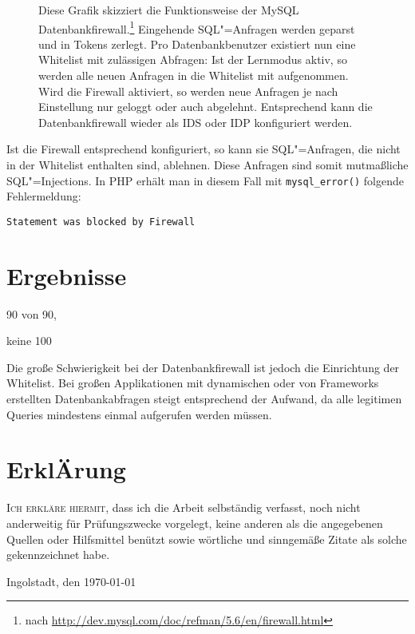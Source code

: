 \begin{figure}[ht]
\begin{margincap}
\begin{tikzpicture}[node distance = 1.5cm, every node/.style={draw=white, align=center, text centered, draw=white, font=\footnotesize\sffamily,fill=documentColor!80, text=white,inner sep=5pt,minimum width=3cm}]
\end{tikzpicture}

\caption[db firewall]{Diese Grafik skizziert die Funktionsweise der MySQL Datenbankfirewall.\footnote{\RaggedRight nach \url{http://dev.mysql.com/doc/refman/5.6/en/firewall.html}} Eingehende SQL"=Anfragen werden geparst und in Tokens zerlegt. Pro Datenbankbenutzer existiert nun eine Whitelist mit zulässigen Abfragen: Ist der Lernmodus aktiv, so werden alle neuen Anfragen in die Whitelist mit aufgenommen. Wird die Firewall aktiviert, so werden neue Anfragen je nach Einstellung nur geloggt oder auch abgelehnt. Entsprechend kann die Datenbankfirewall wieder als IDS oder IDP konfiguriert werden. }
\label{img:db_firewall}
\end{margincap}
\end{figure}


Ist die Firewall entsprechend konfiguriert, so kann sie SQL"=Anfragen, die nicht in der Whitelist enthalten sind, ablehnen. Diese Anfragen sind somit mutmaßliche SQL"=Injections. In PHP erhält man in diesem Fall mit \texttt{mysql_error()} folgende Fehlermeldung:

\begin{listing}[ht!]
\begin{verbatim}
Statement was blocked by Firewall
\end{verbatim}
\end{listing}



\chapter{Ergebnisse}

90 von 90,

keine 100%

Die große Schwierigkeit bei der Datenbankfirewall ist jedoch die Einrichtung der Whitelist. Bei großen Applikationen mit dynamischen oder von Frameworks erstellten Datenbankabfragen steigt entsprechend der Aufwand, da alle legitimen Queries mindestens einmal aufgerufen werden müssen.

\printbibliography


\chapter*{Erkl{\huge Ä}rung}
\lettrine{I}{ch erkläre hiermit,} dass ich die Arbeit selbständig verfasst, noch nicht anderweitig für Prüfungszwecke vorgelegt, keine anderen als die angegebenen Quellen oder Hilfsmittel benützt sowie wörtliche und sinngemäße Zitate als solche gekennzeichnet habe.

\vspace{2\baselineskip}
\noindent Ingolstadt, den \today
\par\noindent\makebox[2.5in]{} \hfill\makebox[2.0in]{\hrulefill}%
\par\noindent\makebox[2.5in][l]{} \hfill{}


